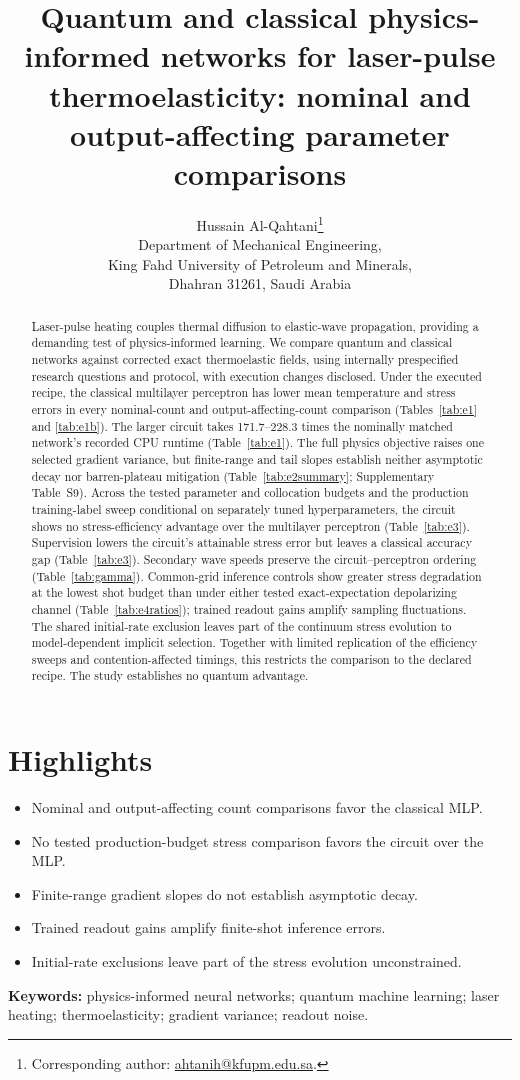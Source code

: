\documentclass[11pt]{article}
\title{Quantum and classical physics-informed networks for laser-pulse
thermoelasticity: nominal and output-affecting parameter comparisons}
\author{Hussain Al-Qahtani\thanks{Corresponding author:
\href{mailto:ahtanih@kfupm.edu.sa}{ahtanih@kfupm.edu.sa}.}\\
\small Department of Mechanical Engineering,\\
\small King Fahd University of Petroleum and Minerals,\\
\small Dhahran 31261, Saudi Arabia}
\date{}
\begin{document}
\maketitle

\begin{abstract}
Laser-pulse heating couples thermal diffusion to elastic-wave propagation,
providing a demanding test of physics-informed learning. We compare quantum
and classical networks against corrected exact thermoelastic fields, using
internally prespecified research questions and protocol, with execution
changes disclosed. Under the executed recipe, the classical multilayer
perceptron has lower mean temperature and stress errors in every nominal-count
and output-affecting-count comparison (Tables~\ref{tab:e1} and \ref{tab:e1b}).
The larger circuit takes 171.7--228.3 times the nominally matched network's
recorded CPU runtime (Table~\ref{tab:e1}). The full physics objective raises
one selected gradient variance, but finite-range and tail slopes establish
neither asymptotic decay nor barren-plateau mitigation
(Table~\ref{tab:e2summary}; Supplementary Table~S9).
Across the tested parameter and collocation budgets and the production
training-label sweep conditional on separately tuned hyperparameters,
the circuit shows no stress-efficiency advantage over the multilayer perceptron
(Table~\ref{tab:e3}). Supervision lowers the circuit's attainable stress
error but leaves a classical accuracy gap (Table~\ref{tab:e3}).
Secondary wave speeds preserve the circuit--perceptron ordering
(Table~\ref{tab:gamma}). Common-grid inference controls show greater stress
degradation at the lowest shot budget than under either tested
exact-expectation depolarizing channel (Table~\ref{tab:e4ratios}); trained
readout gains amplify sampling fluctuations. The shared initial-rate
exclusion leaves part of the continuum stress evolution to model-dependent
implicit selection. Together with limited replication of the efficiency
sweeps and contention-affected timings, this restricts the comparison to
the declared recipe. The study establishes no quantum advantage.
\end{abstract}

\section*{Highlights}
\begin{itemize}
\item Nominal and output-affecting count comparisons favor the classical MLP.
\item No tested production-budget stress comparison favors the circuit over the MLP.
\item Finite-range gradient slopes do not establish asymptotic decay.
\item Trained readout gains amplify finite-shot inference errors.
\item Initial-rate exclusions leave part of the stress evolution unconstrained.
\end{itemize}
\noindent\textbf{Keywords:} physics-informed neural networks; quantum machine
learning; laser heating; thermoelasticity; gradient variance; readout noise.
\end{document}
